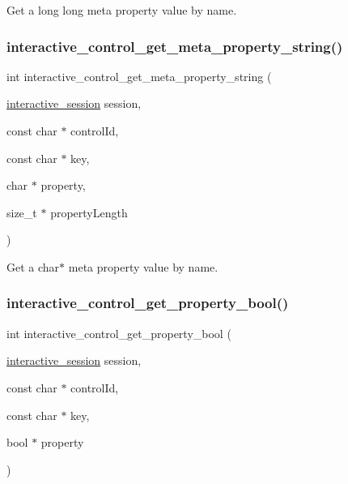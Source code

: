 Get a {\ttfamily long long} meta property value by name. 

\mbox{\label{group___interactivity_gacffbeb973287f6bdaac8e7aa4c96b6d4}} 
\subsubsection{\texorpdfstring{interactive\+\_\+control\+\_\+get\+\_\+meta\+\_\+property\+\_\+string()}{interactive\_control\_get\_meta\_property\_string()}}
{\footnotesize\ttfamily int interactive\+\_\+control\+\_\+get\+\_\+meta\+\_\+property\+\_\+string (\begin{DoxyParamCaption}\item[{\mbox{\hyperlink{group___interactivity_ga6d8819d38b8dc8994a2299cf22a65a31}{interactive\+\_\+session}}}]{session,  }\item[{const char $\ast$}]{control\+Id,  }\item[{const char $\ast$}]{key,  }\item[{char $\ast$}]{property,  }\item[{size\+\_\+t $\ast$}]{property\+Length }\end{DoxyParamCaption})}



Get a {\ttfamily char$\ast$} meta property value by name. 

\mbox{\label{group___interactivity_gab58f1263b7769ff3b6ceb3ffab559a41}} 
\subsubsection{\texorpdfstring{interactive\+\_\+control\+\_\+get\+\_\+property\+\_\+bool()}{interactive\_control\_get\_property\_bool()}}
{\footnotesize\ttfamily int interactive\+\_\+control\+\_\+get\+\_\+property\+\_\+bool (\begin{DoxyParamCaption}\item[{\mbox{\hyperlink{group___interactivity_ga6d8819d38b8dc8994a2299cf22a65a31}{interactive\+\_\+session}}}]{session,  }\item[{const char $\ast$}]{control\+Id,  }\item[{const char $\ast$}]{key,  }\item[{bool $\ast$}]{property }\end{DoxyParamCaption})}



